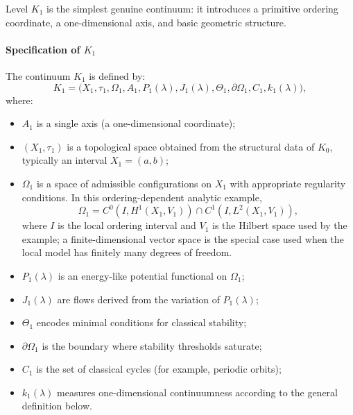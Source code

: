 Level \(K_1\) is the simplest genuine continuum: it introduces a primitive ordering coordinate, a one-dimensional axis, and basic geometric structure.

\paragraph{Specification of \texorpdfstring{\(K_1\)}{K\_1}}
The continuum \(K_1\) is defined by:
\[
    K_1 = \big(X_1,\tau_1,\Omega_1,A_1,P_1(\lambda),J_1(\lambda),\Theta_1,\partial\Omega_1,C_1,k_1(\lambda)\big),
\]
where:
\begin{itemize}
    \item \(A_1\) is a single axis (a one-dimensional coordinate);
    \item \((X_1,\tau_1)\) is a topological space obtained from the structural data of \(K_0\), typically an interval \(X_1 = (a,b)\);
    \item \(\Omega_1\) is a space of admissible configurations on \(X_1\) with appropriate regularity conditions.
          In this ordering-dependent analytic example,
          \[
              \Omega_1 = C^0(I,H^1(X_1,V_1)) \cap C^1(I,L^2(X_1,V_1)),
          \]
          where \(I\) is the local ordering interval and \(V_1\) is the Hilbert space
          used by the example; a finite-dimensional vector space is the
          special case used when the local model has finitely many degrees of
          freedom.
    \item \(P_1(\lambda)\) is an energy-like potential functional on \(\Omega_1\);
    \item \(J_1(\lambda)\) are flows derived from the variation of \(P_1(\lambda)\);
    \item \(\Theta_1\) encodes minimal conditions for classical stability;
    \item \(\partial\Omega_1\) is the boundary where stability thresholds saturate;
    \item \(C_1\) is the set of classical cycles (for example, periodic orbits);
    \item \(k_1(\lambda)\) measures one-dimensional continuumness according to the general definition below.
\end{itemize}

